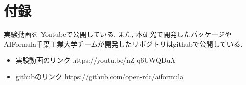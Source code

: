 \chapter*{付録}

実験動画を Youtubeで公開している.
また, 本研究で開発したパッケージやAIFormula千葉工業大学チームが開発したリポジトリはgithubで公開している.

\begin{itemize}
  \item 実験動画のリンク
    https://youtu.be/nZ-q6UWQDuA
  \item githubのリンク
    https://github.com/open-rdc/aiformula
\end{itemize}

